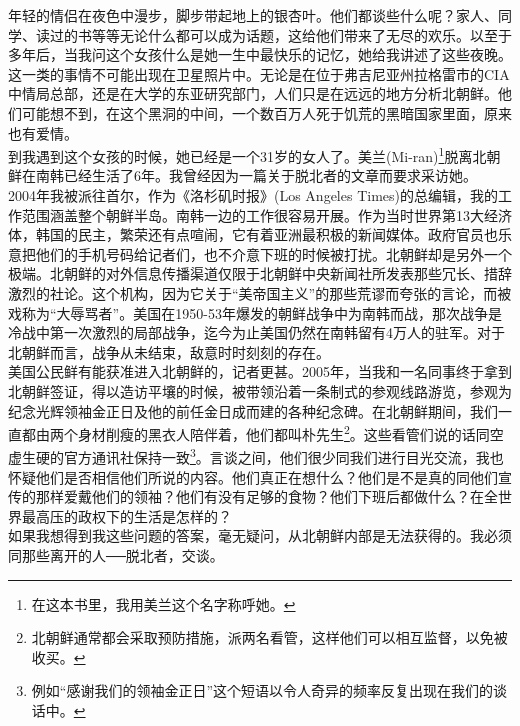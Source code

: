 \begin{multicols}{\theparacolNo}
年轻的情侣在夜色中漫步，脚步带起地上的银杏叶。他们都谈些什么呢？家人、同学、读过的书等等无论什么都可以成为话题，这给他们带来了无尽的欢乐。以至于多年后，当我问这个女孩什么是她一生中最快乐的记忆，她给我讲述了这些夜晚。\\

这一类的事情不可能出现在卫星照片中。无论是在位于弗吉尼亚州拉格雷市的CIA中情局总部，还是在大学的东亚研究部门，人们只是在远远的地方分析北朝鲜。他们可能想不到，在这个黑洞的中间，一个数百万人死于饥荒的黑暗国家里面，原来也有爱情。\\

到我遇到这个女孩的时候，她已经是一个31岁的女人了。美兰(Mi-ran)\footnote{在这本书里，我用美兰这个名字称呼她。}脱离北朝鲜在南韩已经生活了6年。我曾经因为一篇关于脱北者的文章而要求采访她。\\

2004年我被派往首尔，作为《洛杉矶时报》(Los Angeles Times)的总编辑，我的工作范围涵盖整个朝鲜半岛。南韩一边的工作很容易开展。作为当时世界第13大经济体，韩国的民主，繁荣还有点喧闹，它有着亚洲最积极的新闻媒体。政府官员也乐意把他们的手机号码给记者们，也不介意下班的时候被打扰。北朝鲜却是另外一个极端。北朝鲜的对外信息传播渠道仅限于北朝鲜中央新闻社所发表那些冗长、措辞激烈的社论。这个机构，因为它关于“美帝国主义”的那些荒谬而夸张的言论，而被戏称为“大辱骂者”。美国在1950-53年爆发的朝鲜战争中为南韩而战，那次战争是冷战中第一次激烈的局部战争，迄今为止美国仍然在南韩留有4万人的驻军。对于北朝鲜而言，战争从未结束，敌意时时刻刻的存在。\\

美国公民鲜有能获准进入北朝鲜的，记者更甚。2005年，当我和一名同事终于拿到北朝鲜签证，得以造访平壤的时候，被带领沿着一条制式的参观线路游览，参观为纪念光辉领袖金正日及他的前任金日成而建的各种纪念碑。在北朝鲜期间，我们一直都由两个身材削瘦的黑衣人陪伴着，他们都叫朴先生\footnote{北朝鲜通常都会采取预防措施，派两名看管，这样他们可以相互监督，以免被收买。}。这些看管们说的话同空虚生硬的官方通讯社保持一致\footnote{例如“感谢我们的领袖金正日”这个短语以令人奇异的频率反复出现在我们的谈话中。}。言谈之间，他们很少同我们进行目光交流，我也怀疑他们是否相信他们所说的内容。他们真正在想什么？他们是不是真的同他们宣传的那样爱戴他们的领袖？他们有没有足够的食物？他们下班后都做什么？在全世界最高压的政权下的生活是怎样的？\\

如果我想得到我这些问题的答案，毫无疑问，从北朝鲜内部是无法获得的。我必须同那些离开的人──脱北者，交谈。\\


\end{multicols}
